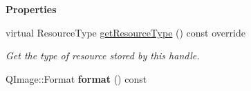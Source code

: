 \begin{Indent}\textbf{ Properties}\par
\begin{DoxyCompactItemize}
\item 
\mbox{\label{classrev_1_1_image_ac862538a9de9b2b280c4c56addb2ea39}} 
virtual Resource\+Type \mbox{\hyperlink{classrev_1_1_image_ac862538a9de9b2b280c4c56addb2ea39}{get\+Resource\+Type}} () const override
\begin{DoxyCompactList}\small\item\em Get the type of resource stored by this handle. \end{DoxyCompactList}\item 
\mbox{\label{classrev_1_1_image_a5ff82c259a7db3f8d2cf98a023c50801}} 
Q\+Image\+::\+Format {\bfseries format} () const
\end{DoxyCompactItemize}
\end{Indent}
